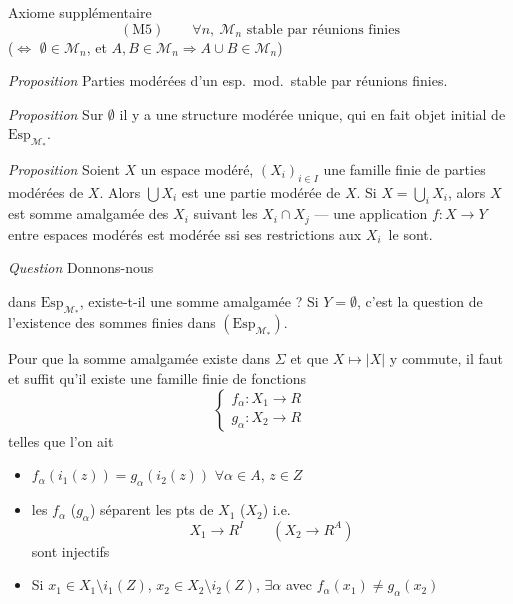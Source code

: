 \documentclass[11pt,a4paper]{article}
\begin{document}
Axiome supplémentaire
\[ (\mathrm{M}5) \qquad \forall n,\ \mathcal{M}_n \text{ stable par réunions
finies} \]
($\Leftrightarrow$ $\emptyset \in \mathcal{M}_n$, et $A, B \in \mathcal{M}_n
\Rightarrow A \cup B \in \mathcal{M}_n$)

\emph{Proposition} Parties modérées d'un esp.\ mod.\ stable par réunions
finies.

\emph{Proposition} Sur $\emptyset$ il y a une structure modérée unique, qui
en fait objet initial de $\mathrm{Esp}_{\mathcal{M}_*}$.

\emph{Proposition} Soient $X$ un espace modéré, $(X_i)_{i \in I}$ une famille
finie de parties modérées de $X$. Alors $\bigcup X_i$ est une partie modérée
de $X$. Si $X = \bigcup_i X_i$, alors $X$ est somme amalgamée des $X_i$ suivant
les $X_i \cap X_j$ --- une application $f : X \to Y$ entre espaces modérés
est modérée ssi ses restrictions aux $X_i\,$ le sont.

\emph{Question} Donnons-nous


dans $\mathrm{Esp}_{\mathcal{M}_*}$, existe-t-il une somme amalgamée ? Si $Y =
\emptyset$, c'est la question de l'existence des sommes finies dans
$(\mathrm{Esp}_{\mathcal{M}_*})$.

Pour que la somme amalgamée existe dans  $\Sigma$ et que $X
\mapsto |X|$ y commute, il faut et suffit qu'il existe une famille finie de
 fonctions
\[ \begin{cases} f_\alpha : X_1 \to R \\ g_\alpha : X_2 \to R \end{cases} \]
telles que l'on ait
\begin{itemize}
  \item[a)] $f_\alpha(i_1(z)) = g_\alpha(i_2(z))$ \quad $\forall \alpha \in A$,
  $z \in Z$
  \item[b)]  les
  $f_\alpha$ ($g_\alpha$) séparent les pts de $X_1$ ($X_2$) i.e.
  \[ X_1 \to R^I \qquad (X_2 \to R^A) \]
  sont injectifs
  \item[c)] Si $x_1 \in X_1 \setminus i_1(Z)$, $x_2 \in X_2 \setminus
  i_2(Z)$, $\exists \alpha$ avec $f_\alpha(x_1) \neq g_\alpha(x_2)$
\end{itemize}
\end{document}

